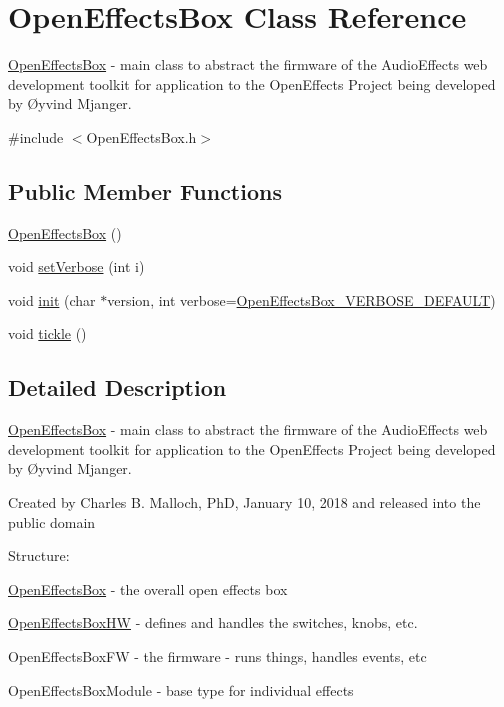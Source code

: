 \hypertarget{class_open_effects_box}{}\section{Open\+Effects\+Box Class Reference}
\label{class_open_effects_box}


\mbox{\hyperlink{class_open_effects_box}{Open\+Effects\+Box}} -\/ main class to abstract the firmware of the Audio\+Effects web development toolkit for application to the Open\+Effects Project being developed by Øyvind Mjanger.  




{\ttfamily \#include $<$Open\+Effects\+Box.\+h$>$}

\subsection*{Public Member Functions}
\begin{DoxyCompactItemize}
\item 
\mbox{\hyperlink{class_open_effects_box_a20aa735d1c8ea776c6ec21087fc2d23a}{Open\+Effects\+Box}} ()
\item 
void \mbox{\hyperlink{class_open_effects_box_a9e14e8a10c05e2aedacf1f8684e5abab}{set\+Verbose}} (int i)
\item 
void \mbox{\hyperlink{class_open_effects_box_aea127362d5b00701ced70f20f728b60f}{init}} (char $\ast$version, int verbose=\mbox{\hyperlink{_open_effects_box_8h_aa08a10c75cee6b15fc7197be8c849b48}{Open\+Effects\+Box\+\_\+\+V\+E\+R\+B\+O\+S\+E\+\_\+\+D\+E\+F\+A\+U\+LT}})
\item 
void \mbox{\hyperlink{class_open_effects_box_a5ce71cb124645f49096492bc37cc0603}{tickle}} ()
\end{DoxyCompactItemize}


\subsection{Detailed Description}
\mbox{\hyperlink{class_open_effects_box}{Open\+Effects\+Box}} -\/ main class to abstract the firmware of the Audio\+Effects web development toolkit for application to the Open\+Effects Project being developed by Øyvind Mjanger. 

Created by Charles B. Malloch, PhD, January 10, 2018 and released into the public domain

Structure\+:
\begin{DoxyItemize}
\item \mbox{\hyperlink{class_open_effects_box}{Open\+Effects\+Box}} -\/ the overall open effects box
\item \mbox{\hyperlink{class_open_effects_box_h_w}{Open\+Effects\+Box\+HW}} -\/ defines and handles the switches, knobs, etc.
\item Open\+Effects\+Box\+FW -\/ the firmware -\/ runs things, handles events, etc
\item Open\+Effects\+Box\+Module -\/ base type for individual effects 
\end{DoxyItemize}

